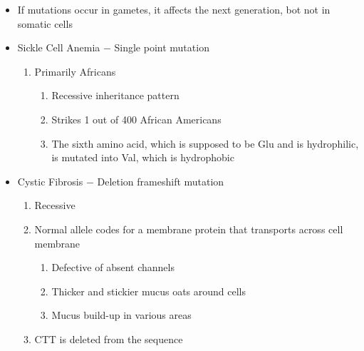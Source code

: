 \documentclass[12pt]{article}
\begin{document}
\begin{itemize}
\begin{enumerate}
\begin{enumerate}
      \end{enumerate}

  \end{enumerate}

\item If mutations occur in gametes, it affects the next generation, bot not in somatic cells

\item Sickle Cell Anemia $-$ Single point mutation

  \begin{enumerate}

    \item Primarily Africans

      \begin{enumerate}

        \item Recessive inheritance pattern

        \item Strikes 1 out of 400 African Americans

        \item The sixth amino acid, which is supposed to be Glu and is hydrophilic, is mutated into Val, which is hydrophobic

      \end{enumerate}

  \end{enumerate}

\item Cystic Fibrosis $-$ Deletion frameshift mutation

  \begin{enumerate}

    \item Recessive

    \item Normal allele codes for a membrane protein that transports  across cell membrane

      \begin{enumerate}

        \item Defective of absent channels

        \item Thicker and stickier mucus oats around cells

        \item Mucus build-up in various areas

      \end{enumerate}

    \item CTT is deleted from the sequence

  \end{enumerate}

\end{itemize}
\end{document}
